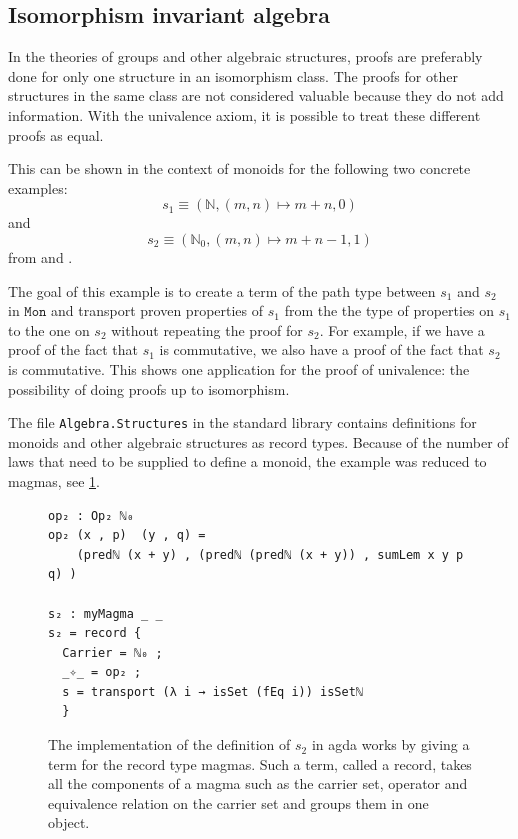 \documentclass[12pt,a4paper,twoside,xetex,draft]{book}
\newcommand{\op}[1]{\mathtt{#1}}
\begin{document}
\subsection{Isomorphism invariant algebra}\label{magmas}

In the theories of groups and other algebraic structures, proofs are preferably done for only one structure in an isomorphism class. The proofs for other structures in the same class are not considered valuable because they do not add information. With the univalence axiom, it is possible to treat these different proofs as equal. 

This can be shown in the context of monoids for the following two concrete examples: $$s_1  \equiv (\mathbb{N}, (m,n)\mapsto m+n, 0)$$ and $$s_2 \equiv (\mathbb{N}_0, (m,n)\mapsto m+n -1, 1)$$ from \cite{Coquand2013} and \cite{Danielsson2012}. 

The goal of this example is to create a term of the path type between  $s_1$ and $s_2$ in $\op{Mon}$ and transport proven properties of $s_1$ from the the type of properties on $s_1$ to the one on $s_2$ without repeating the proof for $s_2$. For example, if we have a proof of the fact that $s_1$ is commutative, we also have a proof of the fact that $s_2$ is commutative. This shows one application for the proof of univalence: the possibility of doing proofs up to isomorphism. 

The file \texttt{Algebra.Structures} in the standard library  \cite{Danielsson2019} contains definitions for monoids and other algebraic structures as record types. Because of the number of  laws that need to be supplied to define a monoid, the example was reduced to magmas, see \cref{m2def}. 

\begin{figure}\label{m2def}
 \centering

 
\begin{BVerbatim}
op₂ : Op₂ ℕ₀
op₂ (x , p)  (y , q) = 
    (predℕ (x + y) , (predℕ (predℕ (x + y)) , sumLem x y p q) )

s₂ : myMagma _ _
s₂ = record {
  Carrier = ℕ₀ ;
  _✧_ = op₂ ;
  s = transport (λ i → isSet (fEq i)) isSetℕ
  }
\end{BVerbatim}
 
 \caption{The implementation of the definition of $s_2$ in agda works by giving a term for the record type magmas. Such a term, called a record, takes all the components of a magma such as the carrier set, operator and equivalence relation on the carrier set and groups them in one object.}
\end{figure}
\end{document}
